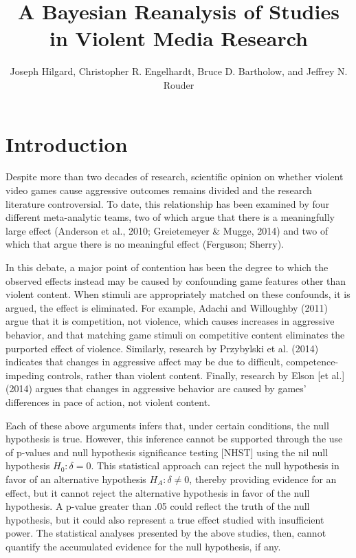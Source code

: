 \documentclass[fignum,nobf,man]{apa}
\author{Joseph Hilgard, Christopher R. Engelhardt, Bruce D. Bartholow, and Jeffrey N. Rouder}
\title{A Bayesian Reanalysis of Studies in Violent Media Research}
\affiliation{University of Missouri}
\begin{document}
\maketitle

\section*{Introduction}
Despite more than two decades of research, scientific opinion on whether violent video games cause aggressive outcomes remains divided and the research literature controversial. To date, this relationship has been examined by four different meta-analytic teams, two of which argue that there is a meaningfully large effect (Anderson et al., 2010; Greietemeyer \& Mugge, 2014) and two of which that argue there is no meaningful effect (Ferguson; Sherry). 

In this debate, a major point of contention has been the degree to which the observed effects instead may be caused by confounding game features other than violent content. When stimuli are appropriately matched on these confounds, it is argued, the effect is eliminated. For example, Adachi and Willoughby (2011) argue that it is competition, not violence, which causes increases in aggressive behavior, and that matching game stimuli on competitive content eliminates the purported effect of violence. Similarly, research by Przybylski et al. (2014) indicates that changes in aggressive affect may be due to difficult, competence-impeding controls, rather than violent content. Finally, research by Elson [et al.] (2014) argues that changes in aggressive behavior are caused by games’ differences in pace of action, not violent content. 

Each of these above arguments infers that, under certain conditions, the null hypothesis is true. However, this inference cannot be supported through the use of p-values and null hypothesis significance testing [NHST] using the nil null hypothesis $H_0: \delta = 0$.  This statistical approach can reject the null hypothesis in favor of an alternative hypothesis $H_A: \delta \neq 0$, thereby providing evidence for an effect, but it cannot reject the alternative hypothesis in favor of the null hypothesis. A p-value greater than .05 could reflect the truth of the null hypothesis, but it could also represent a true effect studied with insufficient power. The statistical analyses presented by the above studies, then, cannot quantify the accumulated evidence for the null hypothesis, if any.
\end{document}
